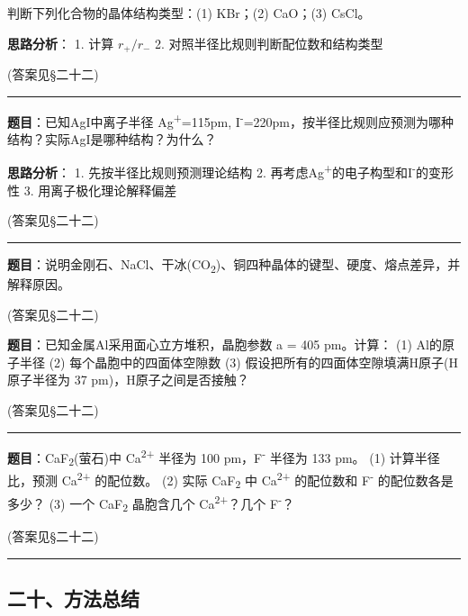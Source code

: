 \documentclass[a4paper,11pt]{ctexart}
\newcommand{\箭}{\ensuremath{\rightarrow}}
\newcommand{\左箭}{\ensuremath{\leftarrow}}
\newcommand{\上箭}{\ensuremath{\uparrow}}
\newcommand{\下箭}{\ensuremath{\downarrow}}
\newcommand{\衡}{\ensuremath{\rightleftharpoons}}
\newcommand{\双箭}{\ensuremath{\leftrightarrow}}
\newcommand{\约等于}{\ensuremath{\approx}}
\newcommand{\小于等于}{\ensuremath{\leq}}
\newcommand{\大于等于}{\ensuremath{\geq}}
\newcommand{\不等于}{\ensuremath{\neq}}
\newcommand{\西格马}{\ensuremath{\sigma}}
\newcommand{\派}{\ensuremath{\pi}}
\begin{document}
判断下列化合物的晶体结构类型：(1) KBr；(2) CaO；(3) CsCl。

\textbf{思路分析}：
1. 计算 \(r_+/r_-\)
2. 对照半径比规则判断配位数和结构类型

(答案见§二十二)

\begin{center}\rule{0.5\linewidth}{0.5pt}\end{center}

\textbf{题目}：已知AgI中离子半径 Ag\textsuperscript{+}=115pm, I\textsuperscript{-}=220pm，按半径比规则应预测为哪种结构？实际AgI是哪种结构？为什么？

\textbf{思路分析}：
1. 先按半径比规则预测理论结构
2. 再考虑Ag\textsuperscript{+}的电子构型和I\textsuperscript{-}的变形性
3. 用离子极化理论解释偏差

(答案见§二十二)

\begin{center}\rule{0.5\linewidth}{0.5pt}\end{center}

\textbf{题目}：说明金刚石、NaCl、干冰(CO\textsubscript{2})、铜四种晶体的键型、硬度、熔点差异，并解释原因。

(答案见§二十二)

\textbf{题目}：已知金属Al采用面心立方堆积，晶胞参数 a = 405 pm。计算：
(1) Al的原子半径
(2) 每个晶胞中的四面体空隙数
(3) 假设把所有的四面体空隙填满H原子(H原子半径为 37 pm)，H原子之间是否接触？

(答案见§二十二)

\begin{center}\rule{0.5\linewidth}{0.5pt}\end{center}

\textbf{题目}：CaF\textsubscript{2}(萤石)中 Ca\textsuperscript{2+} 半径为 100 pm，F\textsuperscript{-} 半径为 133 pm。
(1) 计算半径比，预测 Ca\textsuperscript{2+} 的配位数。
(2) 实际 CaF\textsubscript{2} 中 Ca\textsuperscript{2+} 的配位数和 F\textsuperscript{-} 的配位数各是多少？
(3) 一个 CaF\textsubscript{2} 晶胞含几个 Ca\textsuperscript{2+}？几个 F\textsuperscript{-}？

(答案见§二十二)

\begin{center}\rule{0.5\linewidth}{0.5pt}\end{center}

\subsection{二十、方法总结}\label{ux4e8cux5341ux65b9ux6cd5ux603bux7ed3}
\end{document}
